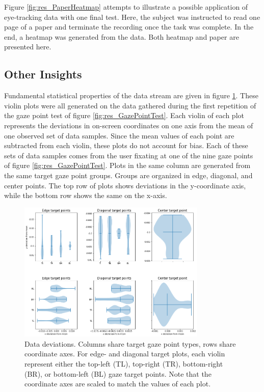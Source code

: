 Figure \ref{fig:res_PaperHeatmap} attempts to illustrate a possible application of eye-tracking data with one final test. Here, the subject was instructed to read one page of a paper and terminate the recording once the task was complete. In the end, a heatmap was generated from the data. Both heatmap and paper are presented here. 


\subsection{Other Insights}

Fundamental statistical properties of the data stream are given in figure \ref{fig:res_DataDeviations}. These violin plots were all generated on the data gathered during the first repetition of the gaze point test of figure \ref{fig:res_GazePointTest}. Each violin of each plot represents the deviations in on-screen coordinates on one axis from the mean of one observed set of data samples. Since the mean values of each point are subtracted from each violin, these plots do not account for bias. Each of these sets of data samples comes from the user fixating at one of the nine gaze points of figure \ref{fig:res_GazePointTest}. Plots in the same column are generated from the same target gaze point groups. Groups are organized in edge, diagonal, and center points. The top row of plots shows deviations in the y-coordinate axis, while the bottom row shows the same on the x-axis.

\begin{figure}[h]
    \centering
    \includegraphics[width=0.8\textwidth]{Images/DataQuality/DataDeviations.png}
    \caption{Data deviations. Columns share target gaze point types, rows share coordinate axes. For edge- and diagonal target plots, each violin represent either the top-left (TL), top-right (TR), bottom-right (BR), or bottom-left (BL) gaze target points. Note that the coordinate axes are scaled to match the values of each plot.}
    \label{fig:res_DataDeviations}
\end{figure}

